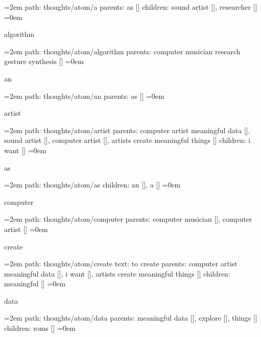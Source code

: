 \par\begingroup
\leftskip=2em
path: thoughts/atom/a
\smallskip
parents:  as []
\smallskip
children: sound artist [], researcher []
\smallskip
\leftskip=0em
\par\endgroup
\bigskip
{}
algorithm
\smallskip
\par\begingroup
\leftskip=2em
path: thoughts/atom/algorithm
\smallskip
parents:  computer musician research gesture synthesis []
\smallskip
\leftskip=0em
\par\endgroup
\bigskip
{}
an
\smallskip
\par\begingroup
\leftskip=2em
path: thoughts/atom/an
\smallskip
parents:  as []
\smallskip
\leftskip=0em
\par\endgroup
\bigskip
{}
artist
\smallskip
\par\begingroup
\leftskip=2em
path: thoughts/atom/artist
\smallskip
parents:  computer artist meaningful data [], sound artist [], computer artist [], artists create meaningful things []
\smallskip
children: i want []
\smallskip
\leftskip=0em
\par\endgroup
\bigskip
{}
as
\smallskip
\par\begingroup
\leftskip=2em
path: thoughts/atom/as
\smallskip
children: an [], a []
\smallskip
\leftskip=0em
\par\endgroup
\bigskip
{}
computer
\smallskip
\par\begingroup
\leftskip=2em
path: thoughts/atom/computer
\smallskip
parents:  computer musician [], computer artist []
\smallskip
\leftskip=0em
\par\endgroup
\bigskip
{}
create
\smallskip
\par\begingroup
\leftskip=2em
path: thoughts/atom/create
\smallskip
text:  to create
\smallskip
parents:  computer artist meaningful data [], i want [], artists create meaningful things []
\smallskip
children: meaningful []
\smallskip
\leftskip=0em
\par\endgroup
\bigskip
{}
data
\smallskip
\par\begingroup
\leftskip=2em
path: thoughts/atom/data
\smallskip
parents:  meaningful data [], explore [], things []
\smallskip
children: roms []
\smallskip
\leftskip=0em
\par\endgroup
